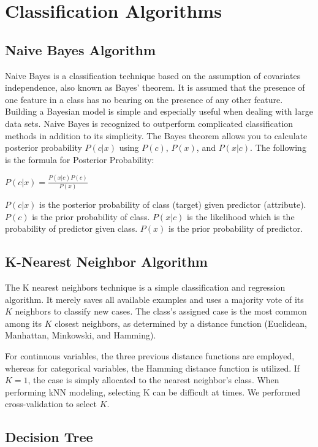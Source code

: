 \documentclass{article}
\begin{document}
\section{Classification Algorithms}

\subsection{Naive Bayes Algorithm}
Naive Bayes is a classification technique based on the assumption of covariates independence, also known as Bayes' theorem. It is assumed that the presence of one feature in a class has no bearing on the presence of any other feature. Building a Bayesian model is simple and especially useful when dealing with large data sets.
Naive Bayes is recognized to outperform complicated classification methods in addition to its simplicity.
The Bayes theorem allows you to calculate posterior probability $P(c|x)$ using $P(c)$, $P(x)$, and $P(x|c)$.
The following is the formula for Posterior Probability:
\begin{center}
$P(c|x) = \frac {P(x|c)P(c)}{P(x)}$
\end{center}
$P(c|x)$ is the posterior probability of class (target) given predictor (attribute). 
$P(c)$ is the prior probability of class. 
$P(x|c)$ is the likelihood which is the probability of predictor given class. 
$P(x)$ is the prior probability of predictor.

\subsection{K-Nearest Neighbor Algorithm}

The K nearest neighbors technique is a simple classification and regression algorithm. It merely saves all available examples and uses a majority vote of its $K$ neighbors to classify new cases. The class's assigned case is the most common among its $K$ closest neighbors, as determined by a distance function (Euclidean, Manhattan, Minkowski, and Hamming).

For continuous variables, the three previous distance functions are employed, whereas for categorical variables, the Hamming distance function is utilized. If $K = 1$, the case is simply allocated to the nearest neighbor's class. When performing kNN modeling, selecting K can be difficult at times. We performed cross-validation to select $K$. 

\subsection{Decision Tree}
\end{document}
